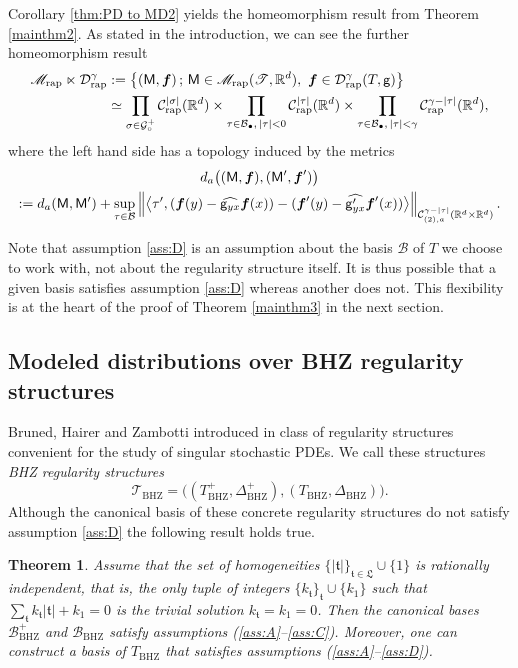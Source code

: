 \documentclass[10pt]{amsart}
\newcommand{\sbullet}{{\scriptscriptstyle\bullet}}
\theoremstyle{plain}
\newtheorem{thm}{Theorem}
\theoremstyle{definition}
\newcommand{\bsf}{\boldsymbol{f}}
\newcommand{\rap}{\mathrm{rap}}
\newcommand{\BHZ}{{\scriptscriptstyle\mathrm{BHZ}}}
\newcommand{\scrM}{\mathscr{M}}
\newcommand{\scrT}{\mathscr{T}}
\newcommand{\frkt}{\mathfrak{t}}
\newcommand{\bbR}{\mathbb{R}}
\newcommand{\mcB}{\mathcal{B}}
\newcommand{\mcC}{\mathcal{C}}
\newcommand{\mcD}{\mathcal{D}}
\newcommand{\mcG}{\mathcal{G}}
\begin{document}
Corollary \ref{thm:PD to MD2} yields the homeomorphism result from Theorem \ref{mainthm2}. As stated in the introduction, we can see the further homeomorphism result
\begin{align*}
\scrM_{\rap}\ltimes\mcD_{\rap}^\gamma
&:=\left\{
({\sf M},\bsf)\,;\, {\sf M}\in\scrM_{\rap}(\scrT,\bbR^d),\ \bsf\in\mcD_{\rap}^\gamma(T,{\sf g}) \right\}\\
&\simeq
\prod_{\sigma\in\mcG_\circ^+} \mcC_\rap^{|\sigma|}(\bbR^d) \times \prod_{\tau\in\mcB_\sbullet,\,|\tau|<0} \mcC_\rap^{|\tau|}(\bbR^d)
\times \prod_{\tau\in\mcB_\sbullet,\, |\tau|<\gamma} \mcC_\rap^{\gamma-|\tau|}(\bbR^d),
\end{align*}
where the left hand side has a topology induced by the metrics
\begin{multline*}
d_a\bigl(({\sf M},\bsf),({\sf M}',\bsf') \bigr)\\
:=d_a({\sf M},{\sf M}')
+\sup_{\tau\in\mcB}\left\| \big\langle \tau',
(\bsf(y)-\widehat{{\sf g}_{yx}}\bsf(x))-(\bsf'(y)-\widehat{{\sf g}'_{yx}}\bsf'(x))
\big\rangle \right\|_{\mcC_{(2),a}^{\gamma-|\tau|}(\bbR^d\times\bbR^d)}.
\end{multline*}

Note that assumption \eqref{ass:D} is an assumption about the basis $\mcB$ of $T$ we choose to work with, not about the regularity structure itself. It is thus possible that a given basis satisfies assumption \eqref{ass:D} whereas another does not. This flexibility is at the heart of the proof of Theorem \ref{mainthm3} in the next section.

\subsection{Modeled distributions over BHZ regularity structures}
\label{SubsectionBHZ-RS}

Bruned, Hairer and Zambotti introduced in \cite{BHZ} class of regularity structures convenient for the study of singular stochastic PDEs. We call these structures \emph{BHZ regularity structures}
\[
\scrT_\BHZ = \bigl((T_{\BHZ}^+,\Delta^+_{\BHZ}), (T_{\BHZ},\Delta_{\BHZ})\bigr).
\]
Although the canonical basis of these concrete regularity structures do not satisfy assumption \eqref{ass:D} the following result holds true.

\begin{thm} \label{prop:reduction of antiderivative}
Assume that the set of homogeneities $\{|\mathfrak{t}|\}_{\mathfrak{t}\in\mathfrak{L}}\cup\{1\}$ is rationally independent, that is, the only tuple of integers $\{k_{\mathfrak{t}}\}_{\frkt}\cup\{k_1\}$ such that $\sum_{\mathfrak{t}}k_{\mathfrak{t}}|\mathfrak{t}|+k_1=0$ is the trivial solution $k_{\mathfrak{t}}=k_1=0$. Then the canonical bases $\mcB_{\BHZ}^+$ and $\mcB_{\BHZ}$ satisfy assumptions \textup{(\ref{ass:A}--\ref{ass:C})}.
Moreover, one can construct a basis of $T_{\BHZ}$ that satisfies assumptions \textup{(\ref{ass:A}--\ref{ass:D})}.
\end{thm}
\end{document}
